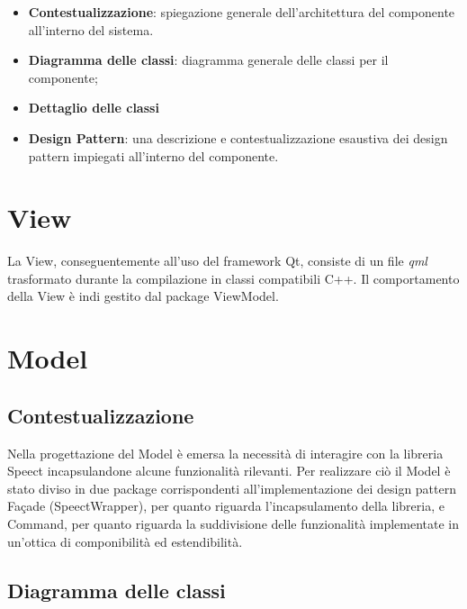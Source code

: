 \documentclass[openany,12pt,a4paper]{report}
\begin{document}
\begin{itemize}
	\item \textbf{Contestualizzazione}: spiegazione generale dell'architettura del componente all'interno del sistema.
	\item \textbf{Diagramma delle classi}: diagramma generale delle classi per il componente;
	\item \textbf{Dettaglio delle classi}
	\item \textbf{Design Pattern}: una descrizione e contestualizzazione esaustiva dei design pattern impiegati all'interno del componente.
\end{itemize} 

\section{View}

La View, conseguentemente all’uso del framework Qt, consiste di un file \textit{qml} trasformato durante la compilazione in classi compatibili C++. Il comportamento della View è indi gestito dal package ViewModel. 

\section{Model}

\subsection{Contestualizzazione}

Nella progettazione del Model è emersa la necessità di interagire con la libreria Speect incapsulandone alcune funzionalità rilevanti. Per realizzare ciò il Model è stato diviso in due package corrispondenti all'implementazione dei design pattern Façade (SpeectWrapper), per quanto riguarda l'incapsulamento della libreria, e Command, per quanto riguarda la suddivisione delle funzionalità implementate in un'ottica di componibilità ed estendibilità.  

\subsection{Diagramma delle classi}
\end{document}
